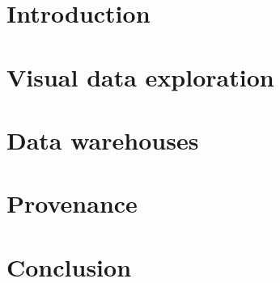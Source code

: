         \section{Introduction}
           
		               
     \section{Visual data exploration}
        \label{sec:visexplorprocess}
		

      \section{Data warehouses}
	\label{sec:olap}
		
\section{Provenance}
	       \label{prov:def}
	       
		    
%	                
%   	               

       \section{Conclusion}
         